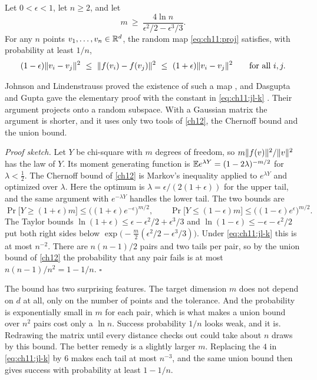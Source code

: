 \begin{theorem}\label{thm:ch11:jl}
Let $0<\epsilon<1$, let $n\ge2$, and let
\begin{equation}\label{eq:ch11:jl-k}
m\ \ge\ \frac{4\ln n}{\epsilon^2/2-\epsilon^3/3}.
\end{equation}
For any $n$ points $v_1,\dots,v_n\in\mathbb{R}^d$, the random map \cref{eq:ch11:proj} satisfies, with probability at least $1/n$,
\begin{equation}\label{eq:ch11:jl}
(1-\epsilon)\norm{v_i-v_j}^2\ \le\ \norm{f(v_i)-f(v_j)}^2\ \le\ (1+\epsilon)\norm{v_i-v_j}^2\qquad\text{for all }i,j .
\end{equation}
\end{theorem}

Johnson and Lindenstrauss proved the existence of such a map \cite{johnsonlindenstrauss1984}, and Dasgupta and Gupta gave the elementary proof with the constant in \cref{eq:ch11:jl-k} \cite{dasguptagupta2003}. Their argument projects onto a random subspace. With a Gaussian matrix the argument is shorter, and it uses only two tools of \cref{ch12}, the Chernoff bound and the union bound.

\emph{Proof sketch.} Let $Y$ be chi-square with $m$ degrees of freedom, so $m\lVert f(v)\rVert^2/\lVert v\rVert^2$ has the law of $Y$. Its moment generating function is $\mathbb{E} e^{\lambda Y}=(1-2\lambda)^{-m/2}$ for $\lambda<\frac12$. The Chernoff bound of \cref{ch12} is Markov's inequality applied to $e^{\lambda Y}$ and optimized over $\lambda$. Here the optimum is $\lambda=\epsilon/(2(1+\epsilon))$ for the upper tail, and the same argument with $e^{-\lambda Y}$ handles the lower tail. The two bounds are
\begin{equation}\label{eq:ch11:chernoff}
\Pr\big[Y\ge(1+\epsilon)m\big]\le\big((1+\epsilon)e^{-\epsilon}\big)^{m/2},\qquad
\Pr\big[Y\le(1-\epsilon)m\big]\le\big((1-\epsilon)e^{\epsilon}\big)^{m/2}.
\end{equation}
The Taylor bounds $\ln(1+\epsilon)\le\epsilon-\epsilon^2/2+\epsilon^3/3$ and $\ln(1-\epsilon)\le-\epsilon-\epsilon^2/2$ put both right sides below $\exp\!\big(-\tfrac m2(\epsilon^2/2-\epsilon^3/3)\big)$. Under \cref{eq:ch11:jl-k} this is at most $n^{-2}$. There are $n(n-1)/2$ pairs and two tails per pair, so by the union bound of \cref{ch12} the probability that any pair fails is at most $n(n-1)/n^2=1-1/n$. \hfill$\square$

The bound has two surprising features. The target dimension $m$ does not depend on $d$ at all, only on the number of points and the tolerance. And the probability is exponentially small in $m$ for each pair, which is what makes a union bound over $n^2$ pairs cost only a $\ln n$. Success probability $1/n$ looks weak, and it is. Redrawing the matrix until every distance checks out could take about $n$ draws by this bound. The better remedy is a slightly larger $m$. Replacing the $4$ in \cref{eq:ch11:jl-k} by $6$ makes each tail at most $n^{-3}$, and the same union bound then gives success with probability at least $1-1/n$.

